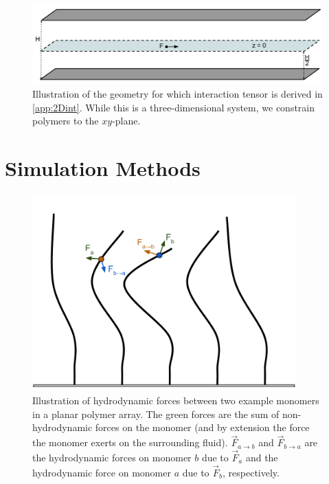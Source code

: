 \documentclass[11pt]{ucthesis}
\begin{document}
\begin{figure}
\begin{center}
\includegraphics[width = \textwidth]{2plates}
\caption{Illustration of the geometry for which interaction tensor
is derived in \ref{app:2Dint}. While this is a three-dimensional
system, we constrain polymers to the $xy$-plane. 
\label{fig:schem}}
\end{center}
\end{figure}

\section{Simulation Methods}
\label{app:sim}

\begin{figure}
\begin{center}
\includegraphics[width = 4in]{hydroforces}
\caption{Illustration of hydrodynamic forces between two example
monomers in a planar polymer array. The green forces are the sum
of non-hydrodynamic forces on the monomer (and by extension the
force the monomer exerts on the surrounding fluid). $\vec F_{a\rightarrow
b}$ and $\vec F_{b\rightarrow a}$ are the hydrodynamic forces on
monomer $b$ due to $\vec F_a$ and the hydrodynamic force on monomer
$a$ due to $\vec F_b$, respectively. 
\label{fig:hydroforces}}
\end{center}
\end{figure}
\end{document}
